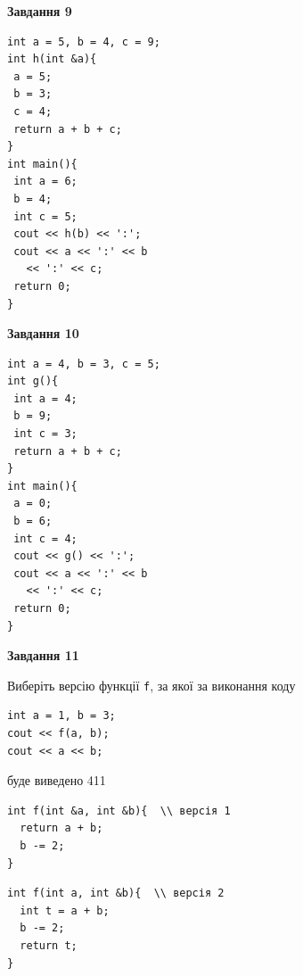 \documentclass[12pt, ukrainian]{article}
\def\code#1{\Verb!#1!}
\begin{document}
{\begin {large}
\begin{minipage}[t]{11.0cm}
\end{minipage}


\begin{minipage}[t]{7.0cm}

\begin{center}
\textbf{Завдання 9}
\end{center}
\vspace{-8mm}

\begin{verbatim}
int a = 5, b = 4, c = 9;
int h(int &a){
 a = 5;
 b = 3;
 c = 4;
 return a + b + c;
}
int main(){
 int a = 6;
 b = 4;
 int c = 5;
 cout << h(b) << ':';
 cout << a << ':' << b 
   << ':' << c;
 return 0;
}
\end{verbatim}



\begin{center}
\textbf{Завдання 10}
\end{center}
\vspace{-8mm}

\begin{verbatim}
int a = 4, b = 3, c = 5;
int g(){
 int a = 4;
 b = 9;
 int c = 3;
 return a + b + c;
}
int main(){
 a = 0;
 b = 6;
 int c = 4;
 cout << g() << ':';
 cout << a << ':' << b 
   << ':' << c;
 return 0;
}
\end{verbatim}

\end{minipage}
\vline \hspace{1mm}
\begin{minipage}[t]{11.0cm}

\begin{center}
\textbf{Завдання 11}
\end{center}
Виберіть версію функції \code{f}, за якої за виконання коду
\begin{verbatim}
int a = 1, b = 3;
cout << f(a, b);
cout << a << b;
\end{verbatim}

буде виведено 411

\begin{verbatim}
int f(int &a, int &b){  \\ версія 1
  return a + b;
  b -= 2;
}
\end{verbatim}

\vspace{-8mm}\begin{verbatim}
int f(int a, int &b){  \\ версія 2
  int t = a + b;
  b -= 2;
  return t;
}
\end{verbatim}


\end{minipage}
\end{large}}
\end{document}

